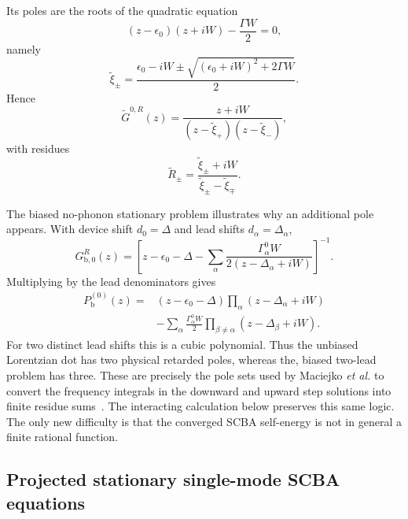 \documentclass[
 reprint,
 superscriptaddress,
 amsmath,amssymb,
 aps,prb,
 longbibliography,
 floatfix
]{revtex4-2}
\begin{document}
Its poles are the roots of the quadratic equation
\begin{equation*}
(z-\epsilon_0)(z+iW)
-\frac{\Gamma W}{2}
=
0,
\end{equation*}
namely
\begin{equation*}
\widetilde\xi_\pm
=
\frac{
\epsilon_0-iW
\pm
\sqrt{
(\epsilon_0+iW)^2+2\Gamma W
}
}{2}.
\end{equation*}
Hence
\begin{equation*}
\widetilde G^{0,R}(z)
=
\frac{z+iW}
{
(z-\widetilde\xi_+)
(z-\widetilde\xi_-)
},
\end{equation*}
with residues
\begin{equation*}
\widetilde R_\pm
=
\frac{
\widetilde\xi_\pm+iW
}{
\widetilde\xi_\pm-\widetilde\xi_\mp
}.
\end{equation*}

The biased no-phonon stationary problem illustrates why an additional pole appears. With device shift $d_0=\Delta$ and lead shifts
$d_\alpha=\Delta_\alpha$,
\begin{equation*}
G_{\mathrm b,0}^R(z)
=
\left[
z-\epsilon_0-\Delta
-
\sum_\alpha
\frac{
\Gamma_\alpha^0 W
}{
2(z-\Delta_\alpha+iW)
}
\right]^{-1}.
\end{equation*}
Multiplying by the lead denominators gives
\begin{equation*}
\begin{aligned}
P_{\mathrm b}^{(0)}(z)
={}&
(z-\epsilon_0-\Delta)
\prod_\alpha
(z-\Delta_\alpha+iW)
\\
&-
\sum_\alpha
\frac{\Gamma_\alpha^0W}{2}
\prod_{\beta\neq\alpha}
(z-\Delta_\beta+iW).
\end{aligned}
\end{equation*}
For two distinct lead shifts this is a cubic polynomial. Thus the unbiased Lorentzian dot has two physical retarded poles, whereas the, biased two-lead problem has three. These are precisely the pole sets used by Maciejko \textit{et al.} to convert the frequency integrals in the downward and upward step solutions into finite residue sums~\cite{MaciejkoWangGuo2006}. The interacting calculation below preserves this same logic. The only new difficulty is that the converged SCBA self-energy is not in general a finite rational function.



\subsection{Projected stationary single-mode SCBA equations}
\label{sec:dot-scba}
\end{document}
